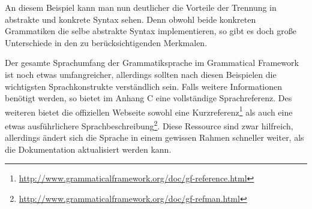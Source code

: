 \documentclass[fontsize=12pt,abstract=on,titlepage,bibliography=totoc,ngerman,listof=totoc]{scrreprt}
\begin{document}
An diesem Beispiel kann man nun deutlicher die Vorteile der Trennung in abstrakte und konkrete Syntax sehen. Denn obwohl beide konkreten Grammatiken die selbe abstrakte Syntax implementieren, so gibt es doch große Unterschiede in den zu berücksichtigenden Merkmalen. \par
Der gesamte Sprachumfang der Grammatiksprache im Grammatical Framework ist noch etwas umfangreicher, allerdings sollten nach diesen Beispielen die wichtigsten Sprachkonstrukte verständlich sein. Falls weitere Informationen benötigt werden, so bietet \cite{RANTA2011} im Anhang C eine vollständige Sprachreferenz. Des weiteren bietet die offiziellen Webseite sowohl eine Kurzreferenz\footnote{\url{http://www.grammaticalframework.org/doc/gf-reference.html}} als auch eine etwas ausführlichere Sprachbeschreibung\footnote{\url{http://www.grammaticalframework.org/doc/gf-refman.html}}. Diese Ressource sind zwar hilfreich, allerdings ändert sich die Sprache in einem gewissen Rahmen schneller weiter, als die Dokumentation aktualisiert werden kann.
\FloatBarrier
\end{document}
